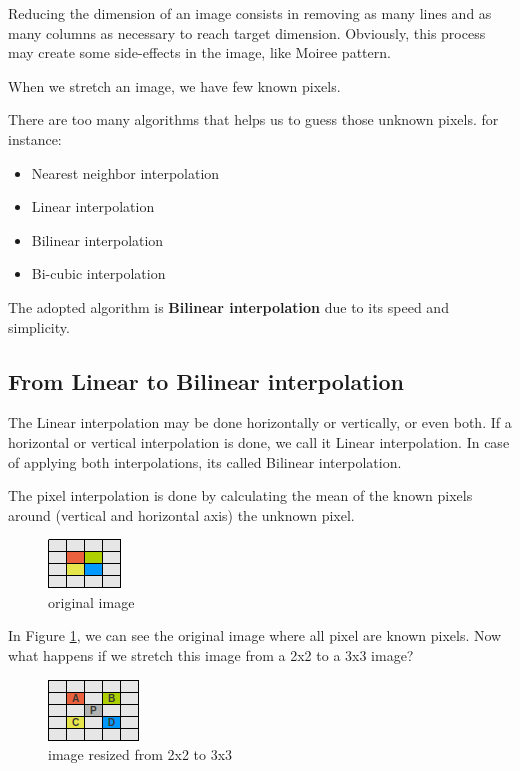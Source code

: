 \documentclass{article}
\begin{document}
	Reducing the dimension of an image consists in removing as many lines and as many columns as necessary to reach target dimension. Obviously, this
	process may create some side-effects in the image, like Moiree pattern.

	When we stretch an image, we have few known pixels.

	There are too many algorithms that helps us to guess those unknown pixels. for instance:

	\begin{itemize}
	  \item Nearest neighbor interpolation
	  \item Linear interpolation
	  \item Bilinear interpolation
	  \item Bi-cubic interpolation
	\end{itemize}

	The adopted algorithm is \textbf{Bilinear interpolation}  due to its speed and simplicity.
	
\subsection{From Linear to Bilinear interpolation}

	The Linear interpolation may be done horizontally or vertically, or even both. If a horizontal or vertical interpolation is done, we call it
	Linear interpolation. In case of applying both interpolations, its called Bilinear interpolation.	

	The pixel interpolation is done by calculating the mean of the known pixels around (vertical and horizontal axis) the unknown pixel. 

	\begin{figure} [H]
		\centering
		\includegraphics[scale=1]{images/bilinear_interpolation_1}
		\caption{original image \label{bilinear1}}
	\end{figure}

	In Figure \ref{bilinear1}, we can see the original image where all pixel are known pixels. Now what happens if we stretch this image 
	from a 2x2 to a 3x3 image?
	
	\begin{figure} [H]
		\centering
		\includegraphics[scale=1]{images/bilinear_interpolation_2}
		\caption{image resized from 2x2 to 3x3 \label{bilinear2}}
	\end{figure}
\end{document}
